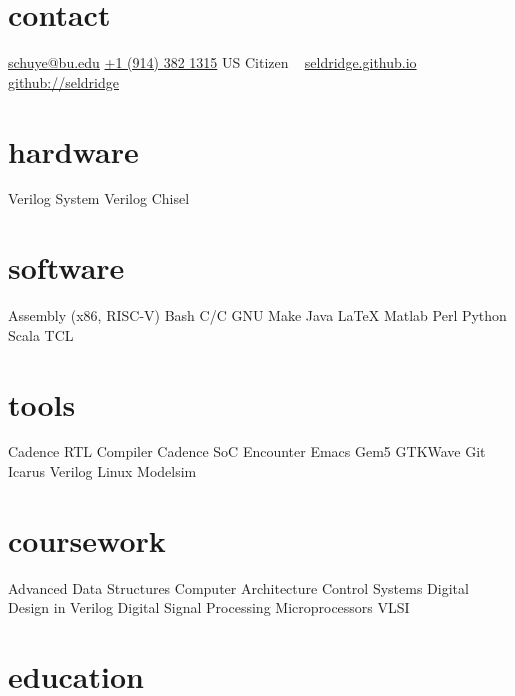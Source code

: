 \documentclass[]{friggeri-cv} %
\begin{document}


\newcommand{\CPP}
{C\nolinebreak[4]\hspace{-.05em}\raisebox{.22ex}{\footnotesize ++}\xspace}

\begin{aside} %
\section{contact}
\href{mailto:schuye@bu.edu}{schuye@bu.edu}
\href{tel:+19143821315}{+1 (914) 382 1315}
US Citizen
~
\href{https://seldridge.github.io}{seldridge.github.io}
\href{https://github.com/seldridge}{github://seldridge}
\section{hardware}
Verilog
System Verilog
Chisel
\section{software}
Assembly (x86, RISC-V)
Bash
C/\CPP
GNU Make
Java
\LaTeX
Matlab
Perl
Python
Scala
TCL
\section{tools}
Cadence RTL Compiler
Cadence SoC Encounter
Emacs
Gem5
GTKWave
Git
Icarus Verilog
Linux
Modelsim
\section{coursework}
Advanced Data Structures
Computer Architecture
Control Systems
Digital Design in Verilog
Digital Signal Processing
Microprocessors
VLSI
\end{aside}


\section{education}
\end{document}
